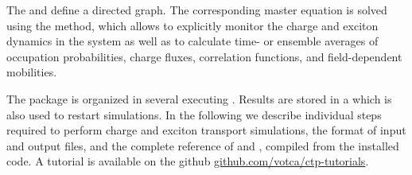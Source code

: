 The  and  define a directed graph. The corresponding master equation is solved using the  method, which allows to explicitly monitor the charge and exciton dynamics in the system as well as to calculate time- or ensemble averages of occupation probabilities, charge fluxes, correlation functions, and field-dependent mobilities. 

The package is organized in several  executing . Results are stored in a  which is also used to restart simulations. In the following we describe individual steps required to perform charge and exciton transport simulations, the format of input and output files, and the complete reference of  and , compiled from the installed code. A tutorial is available on the github \hyperref[https://github.com/votca/ctp-tutorials]{github.com/votca/ctp-tutorials}.
